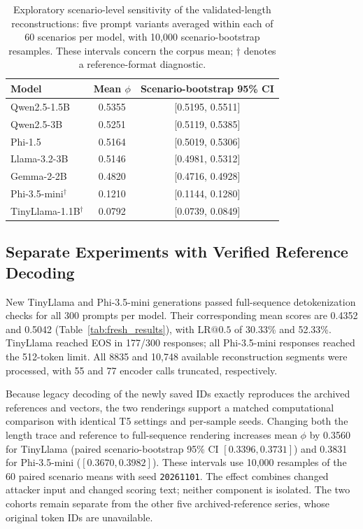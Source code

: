 \documentclass[electronics,article,submit,pdftex,moreauthors]{Definitions/mdpi}
\begin{document}
\begin{table}[ht]
\centering
\caption{Exploratory scenario-level sensitivity of the validated-length reconstructions: five prompt variants averaged within each of 60 scenarios per model, with 10,000 scenario-bootstrap resamples. These intervals concern the corpus mean; $\dagger$ denotes a reference-format diagnostic.}
\label{tab:scenario_sensitivity}
\begin{tabular}{l c c}
\toprule
Model & Mean $\phi$ & Scenario-bootstrap 95\% CI \\
\midrule
Qwen2.5-1.5B & 0.5355 & [0.5195, 0.5511] \\
Qwen2.5-3B & 0.5251 & [0.5119, 0.5385] \\
Phi-1.5 & 0.5164 & [0.5019, 0.5306] \\
Llama-3.2-3B & 0.5146 & [0.4981, 0.5312] \\
Gemma-2-2B & 0.4820 & [0.4716, 0.4928] \\
Phi-3.5-mini$^{\dagger}$ & 0.1210 & [0.1144, 0.1280] \\
TinyLlama-1.1B$^{\dagger}$ & 0.0792 & [0.0739, 0.0849] \\
\bottomrule
\end{tabular}
\end{table}

\subsection{Separate Experiments with Verified Reference Decoding}\label{sec:fresh}
New TinyLlama and Phi-3.5-mini generations passed full-sequence detokenization checks for all 300 prompts per model. Their corresponding mean scores are 0.4352 and 0.5042 (Table~\ref{tab:fresh_results}), with $\mathrm{LR}@0.5$ of 30.33\% and 52.33\%. TinyLlama reached EOS in 177/300 responses; all Phi-3.5-mini responses reached the 512-token limit. All 8835 and 10,748 available reconstruction segments were processed, with 55 and 77 encoder calls truncated, respectively.

Because legacy decoding of the newly saved IDs exactly reproduces the archived references and vectors, the two renderings support a matched computational comparison with identical T5 settings and per-sample seeds. Changing both the length trace and reference to full-sequence rendering increases mean $\phi$ by 0.3560 for TinyLlama (paired scenario-bootstrap 95\% CI $[0.3396,0.3731]$) and 0.3831 for Phi-3.5-mini ($[0.3670,0.3982]$). These intervals use 10,000 resamples of the 60 paired scenario means with seed \texttt{20261101}. The effect combines changed attacker input and changed scoring text; neither component is isolated. The two cohorts remain separate from the other five archived-reference series, whose original token IDs are unavailable.
\end{document}
